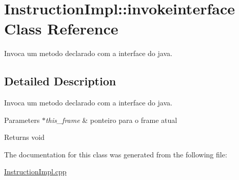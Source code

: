 \hypertarget{class_instruction_impl_1_1invokeinterface}{}\section{Instruction\+Impl\+:\+:invokeinterface Class Reference}
\label{class_instruction_impl_1_1invokeinterface}


Invoca um metodo declarado com a interface do java.  




\subsection{Detailed Description}
Invoca um metodo declarado com a interface do java. 


\begin{DoxyParams}{Parameters}
{\em $\ast$this\+\_\+frame} & ponteiro para o frame atual \\
\hline
\end{DoxyParams}
\begin{DoxyReturn}{Returns}
void 
\end{DoxyReturn}


The documentation for this class was generated from the following file\+:\begin{DoxyCompactItemize}
\item 
\hyperlink{_instruction_impl_8cpp}{Instruction\+Impl.\+cpp}\end{DoxyCompactItemize}
